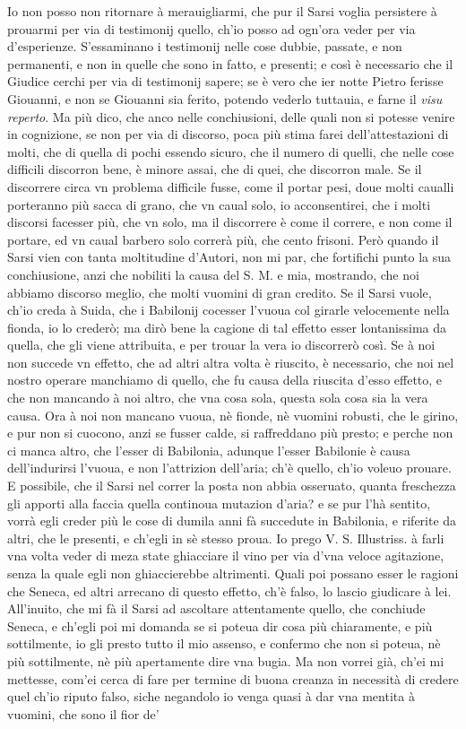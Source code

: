 \documentclass[11pt,twoside,openany]{book}
\begin{document}
Io non posso non ritornare à merauigliarmi, che pur il Sarsi voglia persistere à prouarmi per via di testimonij quello, ch'io posso ad ogn'ora veder per via d'esperienze. S'essaminano i testimonij nelle cose dubbie, passate, e non permanenti, e non in quelle che sono in fatto, e presenti; e così è necessario che il Giudice cerchi per via di testimonij sapere; se è vero che ier notte Pietro ferisse Giouanni, e non se Giouanni sia ferito, potendo vederlo tuttauia, e farne il \textit{visu reperto}. Ma più dico, che anco nelle conchiusioni, delle quali non si potesse venire in cognizione, se non per via di discorso, poca più stima farei dell'attestazioni di molti, che di quella di pochi essendo sicuro, che il numero di quelli, che nelle cose difficili discorron bene, è minore assai, che di quei, che discorron male. Se il discorrere circa vn problema difficile fusse, come il portar pesi, doue molti caualli porteranno più sacca di grano, che vn caual solo, io acconsentirei, che i molti discorsi facesser più, che vn solo, ma il discorrere è come il correre, e non come il portare, ed vn caual barbero solo correrà più, che cento frisoni. Però quando il Sarsi vien con tanta moltitudine d'Autori, non mi par, che fortifichi punto la sua conchiusione, anzi che nobiliti la causa del S. M. e mia, mostrando, che noi abbiamo discorso meglio, che molti vuomini di gran credito. Se il Sarsi vuole, ch'io creda à Suida, che i Babilonij cocesser l'vuoua col girarle velocemente nella fionda, io lo crederò; ma dirò bene la cagione di tal effetto esser lontanissima da quella, che gli viene attribuita, e per trouar la vera io discorrerò così. Se à noi non succede vn effetto, che ad altri altra volta è riuscito, è necessario, che noi nel nostro operare manchiamo di quello, che fu causa della riuscita d'esso effetto, e che non mancando à noi altro, che vna cosa sola, questa sola cosa sia la vera causa. Ora à noi non mancano vuoua, nè fionde, nè vuomini robusti, che le girino, e pur non si cuocono, anzi se fusser calde, si raffreddano più presto; e perche non ci manca altro, che l'esser di Babilonia, adunque l'esser Babilonie è causa dell'indurirsi l'vuoua, e non l'attrizion dell'aria; ch'è quello, ch'io voleuo prouare. E possibile, che il Sarsi nel correr la posta non abbia osseruato, quanta freschezza gli apporti alla faccia quella continoua mutazion d'aria? e se pur l'hà sentito, vorrà egli creder più le cose di dumila anni fà succedute in Babilonia, e riferite da altri, che le presenti, e ch'egli in sè stesso proua. Io prego V. S. Illustriss. à farli vna volta veder di meza state ghiacciare il vino per via d'vna veloce agitazione, senza la quale egli non ghiaccierebbe altrimenti. Quali poi possano esser le ragioni che Seneca, ed altri arrecano di questo effetto, ch'è falso, lo lascio giudicare à lei. All'inuito, che mi fà il Sarsi ad ascoltare attentamente quello, che conchiude Seneca, e ch'egli poi mi domanda se si poteua dir cosa più chiaramente, e più sottilmente, io gli presto tutto il mio assenso, e confermo che non si poteua, nè più sottilmente, nè più apertamente dire vna bugia. Ma non vorrei già, ch'ei mi mettesse, com'ei cerca di fare per termine di buona creanza in necessità di credere quel ch'io riputo falso, siche negandolo io venga quasi à dar vna mentita à vuomini, che sono il fior de' 
\end{document}
